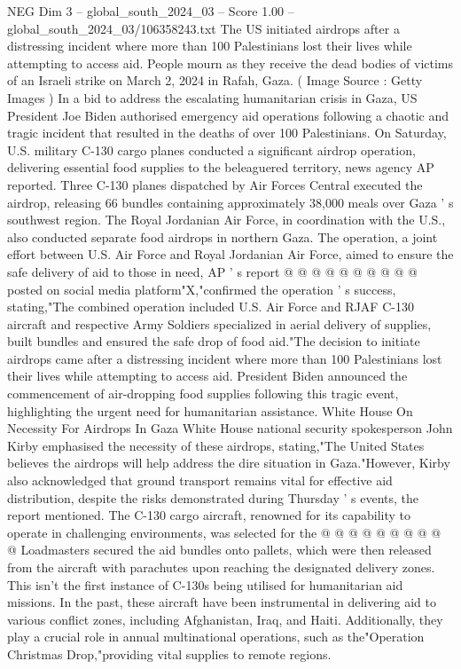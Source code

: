 \begin{textsample}{NEG Dim 3 – global\_south\_2024\_03 – Score 1.00 – global\_south\_2024\_03/106358243.txt}  \label{ex:f3_neg_036}
The US initiated airdrops after a distressing incident where more than 100 Palestinians lost their lives while attempting to access aid.
People mourn as they receive the dead bodies of victims of an Israeli strike on March 2, 2024 in Rafah, Gaza. ( Image Source : Getty Images ) In a bid to address the escalating humanitarian crisis in Gaza, US President Joe Biden authorised emergency aid operations following a chaotic and tragic incident that resulted in the deaths of over 100 Palestinians.
On Saturday, U.S. military C-130 cargo planes conducted a significant airdrop operation, delivering essential food supplies to the beleaguered territory, news agency AP reported.
Three C-130 planes dispatched by Air Forces Central executed the airdrop, releasing 66 bundles containing approximately 38,000 meals over Gaza ' s southwest region.
The Royal Jordanian Air Force, in coordination with the U.S., also conducted separate food airdrops in northern Gaza.
The operation, a joint effort between U.S.
Air Force and Royal Jordanian Air Force, aimed to ensure the safe delivery of aid to those in need, AP ' s report @ @ @ @ @ @ @ @ @ @ posted on social media platform"X,"confirmed the operation ' s success, stating,"The combined operation included U.S.
Air Force and RJAF C-130 aircraft and respective Army Soldiers specialized in aerial delivery of supplies, built bundles and ensured the safe drop of food aid."The decision to initiate airdrops came after a distressing incident where more than 100 Palestinians lost their lives while attempting to access aid.
President Biden announced the commencement of air-dropping food supplies following this tragic event, highlighting the urgent need for humanitarian assistance.
White House On Necessity For Airdrops In Gaza White House national security spokesperson John Kirby emphasised the necessity of these airdrops, stating,"The United States believes the airdrops will help address the dire situation in Gaza."However, Kirby also acknowledged that ground transport remains vital for effective aid distribution, despite the risks demonstrated during Thursday ' s events, the report mentioned.
The C-130 cargo aircraft, renowned for its capability to operate in challenging environments, was selected for the @ @ @ @ @ @ @ @ @ @ Loadmasters secured the aid bundles onto pallets, which were then released from the aircraft with parachutes upon reaching the designated delivery zones.
This isn't the first instance of C-130s being utilised for humanitarian aid missions.
In the past, these aircraft have been instrumental in delivering aid to various conflict zones, including Afghanistan, Iraq, and Haiti.
Additionally, they play a crucial role in annual multinational operations, such as the"Operation Christmas Drop,"providing vital supplies to remote regions.

\end{textsample}
